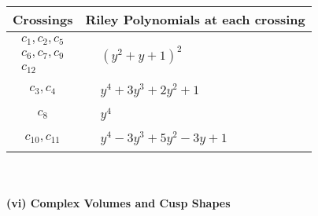 \documentclass[1p]{elsarticle_modified}
\theoremstyle{definition}
\begin{document}
\begin{tabular}{m{50pt}|m{274pt}}
Crossings & \hspace{64pt}Riley Polynomials at each crossing \\
\hline $$\begin{aligned}c_{1},c_{2},c_{5}\\c_{6},c_{7},c_{9}\\c_{12}\end{aligned}$$&$\begin{aligned}
&(y^2+y+1)^2
\end{aligned}$\\
\hline $$\begin{aligned}c_{3},c_{4}\end{aligned}$$&$\begin{aligned}
&y^4+3 y^3+2 y^2+1
\end{aligned}$\\
\hline $$\begin{aligned}c_{8}\end{aligned}$$&$\begin{aligned}
&y^4
\end{aligned}$\\
\hline $$\begin{aligned}c_{10},c_{11}\end{aligned}$$&$\begin{aligned}
&y^4-3 y^3+5 y^2-3 y+1
\end{aligned}$\\
\hline
\end{tabular}\\~\\
\newpage\flushleft \textbf{(vi) Complex Volumes and Cusp Shapes}
\end{document}
